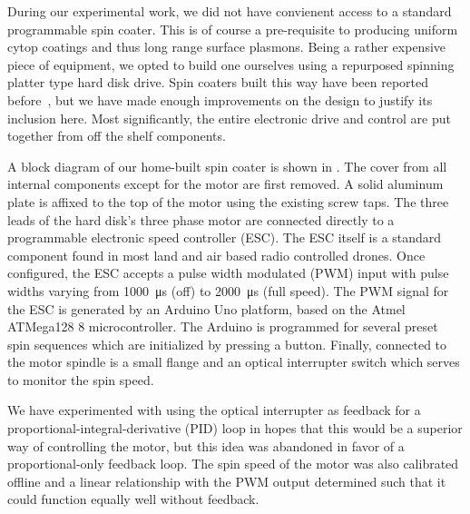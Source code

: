 During our experimental work, we did not have convienent access to a
standard programmable spin coater.  This is of course a pre-requisite to
producing uniform cytop coatings and thus long range surface plasmons.
Being a rather expensive piece of equipment, we opted to build one
ourselves using a repurposed spinning platter type hard disk drive.
Spin coaters built this way have been reported
before~\cite{bianchi2006spin}, but we have made enough improvements on the
design to justify its inclusion here.  Most significantly, the entire
electronic drive and control are put together from off the shelf
components.

A block diagram of our home-built spin coater is shown in .
The cover from all internal components except for the motor are first
removed.  A solid aluminum plate is affixed to the top of the motor using
the existing screw taps.  The three leads of the hard disk's three phase
motor are connected directly to a programmable electronic speed controller
(ESC).  The ESC itself is a standard component found in most land and air
based radio controlled drones.  Once configured, the ESC accepts a pulse
width modulated (PWM) input with pulse widths varying from
\SI{1000}{\micro\second} (off) to \SI{2000}{\micro\second} (full speed).
The PWM signal for the ESC is generated by an Arduino Uno platform, based
on the Atmel ATMega128 \SI{8}{\bit} microcontroller.  The Arduino is
programmed for several preset spin sequences which are initialized by
pressing a button.  Finally, connected to the motor spindle is a small
flange and an optical interrupter switch which serves to monitor the spin
speed.  

We have experimented with using the optical interrupter as feedback for a
proportional-integral-derivative (PID) loop in hopes that this would be a
superior way of controlling the motor, but this idea was abandoned in favor
of a proportional-only feedback loop.  The spin speed of the motor was also
calibrated offline and a linear relationship with the PWM output determined
such that it could function equally well without feedback.  

